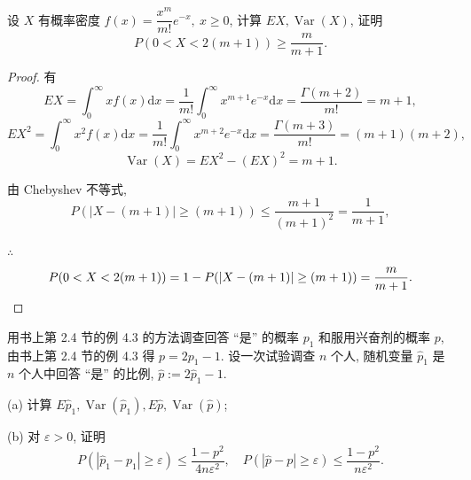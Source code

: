 \documentclass[color=black,device=normal,lang=cn]{elegantnote}
\numberwithin{equation}{section}
\theoremstyle{plain}
\numberwithin{exercise}{exsection}
\begin{document}
\newpage
\begin{exercise}%
    设 $X$ 有概率密度 $f(x)=\dfrac{x^m}{m!}e^{-x},\ x\geq0$, 计算 $EX,\operatorname{Var}(X)$, 证明
    \[P(0<X<2(m+1))\geq\dfrac{m}{m+1}.\]
\end{exercise}
\begin{proof}
    有
    \[EX=\int_0^\infty xf(x)\mathrm{d}x=\dfrac{1}{m!}\int_0^\infty x^{m+1}e^{-x}\mathrm{d}x=\dfrac{\Gamma(m+2)}{m!}=m+1,\]
    \[EX^2=\int_0^\infty x^2f(x)\mathrm{d}x=\dfrac{1}{m!}\int_0^\infty x^{m+2}e^{-x}\mathrm{d}x=\dfrac{\Gamma(m+3)}{m!}=(m+1)(m+2),\]
    \[\operatorname{Var}(X)=EX^2-(EX)^2=m+1.\]

    由 Chebyshev 不等式,
    \[P(|X-(m+1)|\geq(m+1))\leq\dfrac{m+1}{(m+1)^2}=\dfrac{1}{m+1},\]

    $\therefore$
    \[P(0<X<2(m+1))=1-P(|X-(m+1)|\geq(m+1))=\dfrac{m}{m+1}.\qedhere\]
\end{proof}
\begin{exercise}%
    用书上第 2.4 节的例 4.3 的方法调查回答 ``是'' 的概率 $p_1$ 和服用兴奋剂的概率 $p$, 由书上第 2.4 节的例 4.3 得 $p=2p_1-1$. 设一次试验调查 $n$ 个人, 随机变量 $\hat{p}_1$ 是 $n$ 个人中回答 ``是'' 的比例, $\hat{p}:=2\hat{p}_1-1$.
    
    (a) 计算 $E\hat{p}_1,\operatorname{Var}(\hat{p}_1),E\hat{p},\operatorname{Var}(\hat{p})$;

    (b) 对 $\varepsilon>0$, 证明
    \[P(|\hat{p}_1-p_1|\geq\varepsilon)\leq\dfrac{1-p^2}{4n\varepsilon^2},\quad P(|\hat{p}-p|\geq\varepsilon)\leq\dfrac{1-p^2}{n\varepsilon^2}.\]
\end{exercise}
\end{document}
